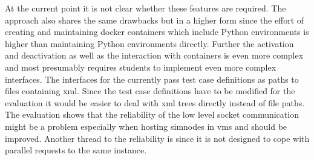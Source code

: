 At the current point it is not clear whether these features are required.
The approach also shares the same drawbacks but in a higher form since the effort of creating and maintaining docker containers which include Python environments is higher than maintaining Python environments directly.
Further the activation and deactivation as well as the interaction with \docker{} containers is even more complex and most presumably requires students to implement even more complex interfaces.
The interfaces for the \submissiontester{} currently pass test case definitions as paths to files containing \gls{xml}.
Since the test case definitions have to be modified for the evaluation it would be easier to deal with \gls{xml} trees directly instead of file paths.
The evaluation shows that the reliability of the low level socket communication might be a problem especially when hosting \glspl{simnode} in \glspl{vm} and should be improved.
Another thread to the reliability is \beamngpy{} since it is not designed to cope with parallel requests to the same \beamng{} instance.\\
